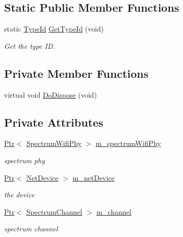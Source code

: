 \subsection*{Static Public Member Functions}
\begin{DoxyCompactItemize}
\item 
static \hyperlink{classns3_1_1TypeId}{Type\+Id} \hyperlink{classns3_1_1WifiSpectrumPhyInterface_a54f1334d1df2cb6462ac001464dfd545}{Get\+Type\+Id} (void)
\begin{DoxyCompactList}\small\item\em Get the type ID. \end{DoxyCompactList}\end{DoxyCompactItemize}
\subsection*{Private Member Functions}
\begin{DoxyCompactItemize}
\item 
virtual void \hyperlink{classns3_1_1WifiSpectrumPhyInterface_a9bfabad805cbb7cb741fab528afa21af}{Do\+Dispose} (void)
\end{DoxyCompactItemize}
\subsection*{Private Attributes}
\begin{DoxyCompactItemize}
\item 
\hyperlink{classns3_1_1Ptr}{Ptr}$<$ \hyperlink{classns3_1_1SpectrumWifiPhy}{Spectrum\+Wifi\+Phy} $>$ \hyperlink{classns3_1_1WifiSpectrumPhyInterface_ae3f3c7b1e293fe041972e71fdcc39630}{m\+\_\+spectrum\+Wifi\+Phy}
\begin{DoxyCompactList}\small\item\em spectrum phy \end{DoxyCompactList}\item 
\hyperlink{classns3_1_1Ptr}{Ptr}$<$ \hyperlink{classns3_1_1NetDevice}{Net\+Device} $>$ \hyperlink{classns3_1_1WifiSpectrumPhyInterface_a62ccaf33755afa7dc2db72f36523d3b6}{m\+\_\+net\+Device}
\begin{DoxyCompactList}\small\item\em the device \end{DoxyCompactList}\item 
\hyperlink{classns3_1_1Ptr}{Ptr}$<$ \hyperlink{classns3_1_1SpectrumChannel}{Spectrum\+Channel} $>$ \hyperlink{classns3_1_1WifiSpectrumPhyInterface_ad1207cf8cf13addc6c513d911ef3bd8c}{m\+\_\+channel}
\begin{DoxyCompactList}\small\item\em spectrum channel \end{DoxyCompactList}\end{DoxyCompactItemize}
